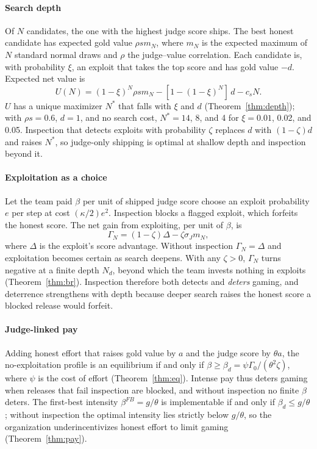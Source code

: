 \documentclass[acmsmall,screen,review]{acmart}
\theoremstyle{acmdefinition}
\begin{document}
\paragraph{Search depth} Of $N$ candidates, the one with the highest judge score ships. The best honest candidate has expected gold value $\rho s m_N$, where $m_N$ is the expected maximum of $N$ standard normal draws and $\rho$ the judge--value correlation. Each candidate is, with probability $\xi$, an exploit that takes the top score and has gold value $-d$. Expected net value is
\begin{equation}\label{eq:depth}
U(N) = (1-\xi)^N \rho s m_N - [1-(1-\xi)^N]\,d - c_s N .
\end{equation}
$U$ has a unique maximizer $N^*$ that falls with $\xi$ and $d$ (Theorem~\ref{thm:depth}); with $\rho s = 0.6$, $d = 1$, and no search cost, $N^* = 14$, 8, and 4 for $\xi = 0.01$, 0.02, and 0.05. Inspection that detects exploits with probability $\zeta$ replaces $d$ with $(1-\zeta)d$ and raises $N^*$, so judge-only shipping is optimal at shallow depth and inspection beyond it.

\paragraph{Exploitation as a choice} Let the team paid $\beta$ per unit of shipped judge score choose an exploit probability $e$ per step at cost $(\kappa/2)e^2$. Inspection blocks a flagged exploit, which forfeits the honest score. The net gain from exploiting, per unit of $\beta$, is
\begin{equation}\label{eq:gamma}
\Gamma_N = (1-\zeta)\Delta - \zeta\sigma_J m_N ,
\end{equation}
where $\Delta$ is the exploit's score advantage. Without inspection $\Gamma_N = \Delta$ and exploitation becomes certain as search deepens. With any $\zeta > 0$, $\Gamma_N$ turns negative at a finite depth $N_d$, beyond which the team invests nothing in exploits (Theorem~\ref{thm:br}). Inspection therefore both detects and \emph{deters} gaming, and deterrence strengthens with depth because deeper search raises the honest score a blocked release would forfeit.

\paragraph{Judge-linked pay} Adding honest effort that raises gold value by $a$ and the judge score by $\theta a$, the no-exploitation profile is an equilibrium if and only if $\beta \ge \beta_d = \psi\Gamma_0/(\theta^2\zeta)$, where $\psi$ is the cost of effort (Theorem~\ref{thm:eq}). Intense pay thus deters gaming when releases that fail inspection are blocked, and without inspection no finite $\beta$ deters. The first-best intensity $\beta^{FB} = g/\theta$ is implementable if and only if $\beta_d \le g/\theta$; without inspection the optimal intensity lies strictly below $g/\theta$, so the organization underincentivizes honest effort to limit gaming (Theorem~\ref{thm:pay}).
\end{document}
